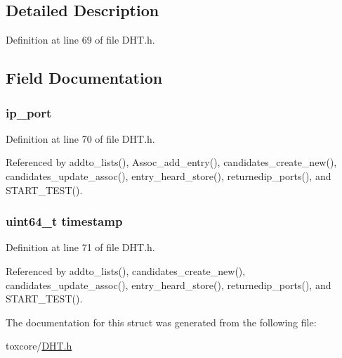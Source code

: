 \subsection{Detailed Description}


Definition at line 69 of file D\+H\+T.\+h.



\subsection{Field Documentation}
\hypertarget{struct_i_p_p_ts_a86e2a5a56c0dd22df6e8b8a10e40f9e4}{
\subsubsection[{ip\+\_\+port}]{ ip\+\_\+port}}\label{struct_i_p_p_ts_a86e2a5a56c0dd22df6e8b8a10e40f9e4}


Definition at line 70 of file D\+H\+T.\+h.



Referenced by addto\+\_\+lists(), Assoc\+\_\+add\+\_\+entry(), candidates\+\_\+create\+\_\+new(), candidates\+\_\+update\+\_\+assoc(), entry\+\_\+heard\+\_\+store(), returnedip\+\_\+ports(), and S\+T\+A\+R\+T\+\_\+\+T\+E\+S\+T().

\hypertarget{struct_i_p_p_ts_a465bef81f6478756e5443025b1f2ddfa}{
\subsubsection[{timestamp}]{\setlength{\rightskip}{0pt plus 5cm}uint64\+\_\+t timestamp}}\label{struct_i_p_p_ts_a465bef81f6478756e5443025b1f2ddfa}


Definition at line 71 of file D\+H\+T.\+h.



Referenced by addto\+\_\+lists(), candidates\+\_\+create\+\_\+new(), candidates\+\_\+update\+\_\+assoc(), entry\+\_\+heard\+\_\+store(), returnedip\+\_\+ports(), and S\+T\+A\+R\+T\+\_\+\+T\+E\+S\+T().



The documentation for this struct was generated from the following file\+:\begin{DoxyCompactItemize}
\item 
toxcore/\hyperlink{_d_h_t_8h}{D\+H\+T.\+h}\end{DoxyCompactItemize}
